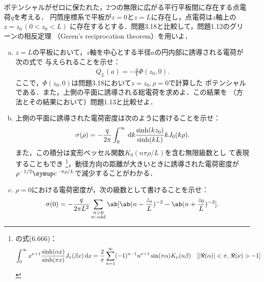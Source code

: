 \begin{bx1}
  ポテンシャルがゼロに保たれた，2つの無限に広がる平行平板間に存在する点電荷$q$を考える．
  円筒座標系で平板が$z = 0$と$z = L$に存在し，点電荷は$z$軸上の$z = z_0 \, (0 < z_0 < L)$
  に存在するとする．問題3.18と比較して，問題1.12のグリーンの相反定理
  （Green's reciprocation theorem）を用いよ．
  \begin{enumerate}[(a)]%
    \item
      $z = L$の平板において，$z$軸を中心とする半径$a$の円内部に誘導される電荷が次の式で
      与えられることを示せ：
      \begin{gather}%
        Q_L(a) = -\frac{q}{V} \Phi(z_0, 0).
      \end{gather}%
      ここで，$\Phi(z_0, 0)$は問題3.18において$z = z_0, \rho = 0$で計算した
      ポテンシャルである．また，上側の平面に誘導される総電荷を求めよ．この結果を
      （方法とその結果において）問題1.13と比較せよ．
    \item 
      上側の平面に誘導された電荷密度は次のように書けることを示せ：
      \begin{gather}%
        \sigma(\rho) = -\frac{q}{2\pi} \int_0^\infty \dl{k} \frac{\sinh(kz_0)}{\sinh(kL)} kJ_0(k\rho).
      \end{gather}%
      また，この積分は変形ベッセル関数$K_0(n\pi \rho/L)$を含む無限級数とし
      て表現することもでき
      \footnote{
        \cite{gradshteyn2014}の式(6.666)：
        \begin{gather}%
          \int_0^\infty  x^{\nu+1} \frac{\sinh(\alpha x)}{\sinh(\pi x)} J_\nu(\beta x) \dl{x}
          = \frac{2}{\pi} \sum_{n=1}^\infty (-1)^{n-1} n^{\nu+1} \sin(\pi\alpha) K_\nu(n \beta) 
          \qq [|\Re(\alpha)| < \pi,\, \Re(\nu) > -1]
        \end{gather}%
      }，動径方向の距離が大きいときに誘導された電荷密度が
      $\rho^{-1/2}\e^{-\pi\rho/L}$で減少することがわかる．
    \item 
      $\rho = 0$における電荷密度が，次の級数として書けることを示せ：
      \begin{gather}
        \sigma(0) = -\frac{q}{2\pi L^2}\sum_{\substack{n>0\\n:\,\text{odd}}} \ab[
          \ab(n-\frac{z_o}{L})^{-2} - \ab(n+ \frac{z_0}{L})^{-2}
        ].
      \end{gather}
  \end{enumerate}%

\end{bx1}
\clearpage
